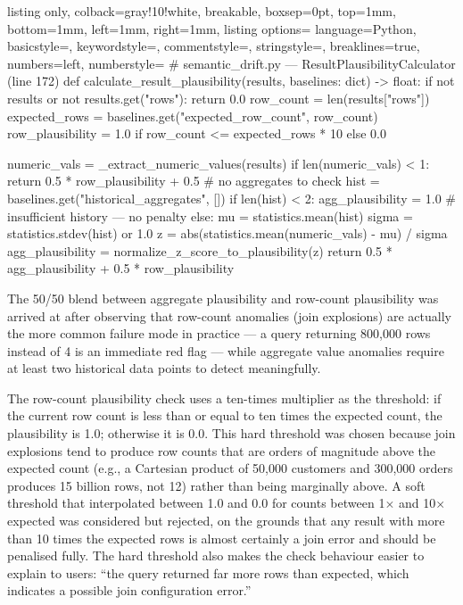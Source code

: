 \documentclass[12pt,a4paper]{report}
\begin{document}
\begin{tcblisting}{listing only, colback=gray!10!white, breakable, boxsep=0pt,
  top=1mm, bottom=1mm, left=1mm, right=1mm,
  listing options={
    language=Python, basicstyle=\small\ttfamily,
    keywordstyle=\color{kwcolor}, commentstyle=\color{cmtcolor},
    stringstyle=\color{strcolor}, breaklines=true,
    numbers=left, numberstyle=\tiny\color{gray}}}
# semantic_drift.py — ResultPlausibilityCalculator (line 172)
def calculate_result_plausibility(results, baselines: dict) -> float:
    if not results or not results.get("rows"):
        return 0.0
    row_count = len(results["rows"])
    expected_rows = baselines.get("expected_row_count", row_count)
    row_plausibility = 1.0 if row_count <= expected_rows * 10 else 0.0

    numeric_vals = _extract_numeric_values(results)
    if len(numeric_vals) < 1:
        return 0.5 * row_plausibility + 0.5  # no aggregates to check
    hist = baselines.get("historical_aggregates", [])
    if len(hist) < 2:
        agg_plausibility = 1.0   # insufficient history — no penalty
    else:
        mu = statistics.mean(hist)
        sigma = statistics.stdev(hist) or 1.0
        z = abs(statistics.mean(numeric_vals) - mu) / sigma
        agg_plausibility = normalize_z_score_to_plausibility(z)
    return 0.5 * agg_plausibility + 0.5 * row_plausibility
\end{tcblisting}

The 50/50 blend between aggregate plausibility and row-count plausibility was arrived at after observing that row-count anomalies (join explosions) are actually the more common failure mode in practice — a query returning 800,000 rows instead of 4 is an immediate red flag — while aggregate value anomalies require at least two historical data points to detect meaningfully.

The row-count plausibility check uses a ten-times multiplier as the threshold: if the current row count is less than or equal to ten times the expected count, the plausibility is 1.0; otherwise it is 0.0. This hard threshold was chosen because join explosions tend to produce row counts that are orders of magnitude above the expected count (e.g., a Cartesian product of 50,000 customers and 300,000 orders produces 15 billion rows, not 12) rather than being marginally above. A soft threshold that interpolated between 1.0 and 0.0 for counts between 1$\times$ and 10$\times$ expected was considered but rejected, on the grounds that any result with more than 10 times the expected rows is almost certainly a join error and should be penalised fully. The hard threshold also makes the check behaviour easier to explain to users: ``the query returned far more rows than expected, which indicates a possible join configuration error.''
\end{document}
